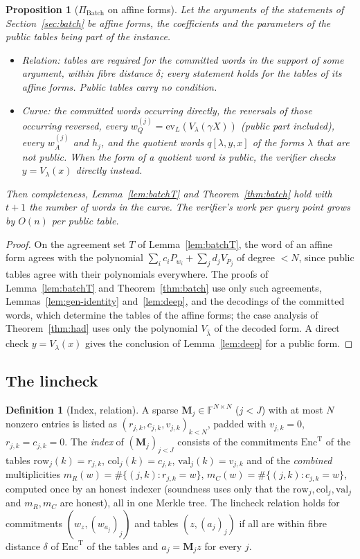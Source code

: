 \documentclass[11pt]{article}
\newtheorem{proposition}[theorem]{Proposition}
\theoremstyle{definition}
\newtheorem{definition}[theorem]{Definition}
\newcommand{\F}{\mathbb{F}}
\newcommand{\ev}{\mathrm{ev}}
\begin{document}
\begin{proposition}[$\Pi_{\mathrm{Batch}}$ on affine forms]\label{prop:affine}
Let the arguments of the statements of Section~\ref{sec:batch} be affine forms, the coefficients and the parameters of the public tables being part of the instance.
\begin{itemize}[nosep]
\item \emph{Relation:} tables are required for the committed words in the support of some argument, within fibre distance $\delta$; every statement holds for the tables of its affine forms. Public tables carry no condition.
\item \emph{Curve:} the committed words occurring directly, the reversals of those occurring reversed, every $w_Q^{(j)}=\ev_L(V_{\lambda}(\gamma X))$ (public part included), every $w_A^{(j)}$ and $h_j$, and the quotient words $q[\lambda,y,x]$ of the forms $\lambda$ that are not public. When the form of a quotient word is public, the verifier checks $y=V_\lambda(x)$ directly instead.
\end{itemize}
Then completeness, Lemma~\ref{lem:batchT} and Theorem~\ref{thm:batch} hold with $t+1$ the number of words in the curve. The verifier's work per query point grows by $O(n)$ per public table.
\end{proposition}
\begin{proof}
On the agreement set $T$ of Lemma~\ref{lem:batchT}, the word of an affine form agrees with the polynomial $\sum_ic_iP_{w_i}+\sum_jd_jV_{P_j}$ of degree $<N$, since public tables agree with their polynomials everywhere. The proofs of Lemma~\ref{lem:batchT} and Theorem~\ref{thm:batch} use only such agreements, Lemmas~\ref{lem:gen-identity} and~\ref{lem:deep}, and the decodings of the committed words, which determine the tables of the affine forms; the case analysis of Theorem~\ref{thm:had} uses only the polynomial $V_{\hat\lambda}$ of the decoded form. A direct check $y=V_\lambda(x)$ gives the conclusion of Lemma~\ref{lem:deep} for a public form.
\end{proof}

\subsection{The lincheck}

\begin{definition}[Index, relation]
A sparse $\mathbf M_j\in\F^{N\times N}$ ($j<J$) with at most $N$ nonzero entries is listed as $(r_{j,k},c_{j,k},v_{j,k})_{k<N}$, padded with $v_{j,k}=0$, $r_{j,k}=c_{j,k}=0$. The \emph{index} of $(\mathbf M_j)_{j<J}$ consists of the commitments $\mathrm{Enc}^{\mathrm T}$ of the tables $\mathrm{row}_j(k)=r_{j,k}$, $\mathrm{col}_j(k)=c_{j,k}$, $\mathrm{val}_j(k)=v_{j,k}$ and of the \emph{combined} multiplicities $m_R(w)=\#\{(j,k):r_{j,k}=w\}$, $m_C(w)=\#\{(j,k):c_{j,k}=w\}$, computed once by an honest indexer (soundness uses only that the $\mathrm{row}_j,\mathrm{col}_j,\mathrm{val}_j$ and $m_R,m_C$ are honest), all in one Merkle tree.
The lincheck relation holds for commitments $(w_z,(w_{a_j})_j)$ and tables $(z,(a_j)_j)$ if all are within fibre distance $\delta$ of $\mathrm{Enc}^{\mathrm T}$ of the tables and $a_j=\mathbf M_jz$ for every $j$.
\end{definition}
\end{document}
